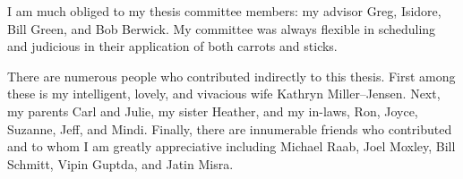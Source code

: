 I am much obliged to my thesis committee members: my advisor Greg,
Isidore, Bill Green, and Bob Berwick.  My committee was always
flexible in scheduling and judicious in their application of both
carrots and sticks.

There are numerous people who contributed indirectly to this thesis.
First among these is my intelligent, lovely, and vivacious wife
Kathryn Miller--Jensen.  Next, my parents Carl and Julie, my sister
Heather, and my in-laws, Ron, Joyce, Suzanne, Jeff, and Mindi.
Finally, there are innumerable friends who contributed and to whom I
am greatly appreciative including Michael Raab, Joel Moxley, Bill
Schmitt, Vipin Guptda, and Jatin Misra.


